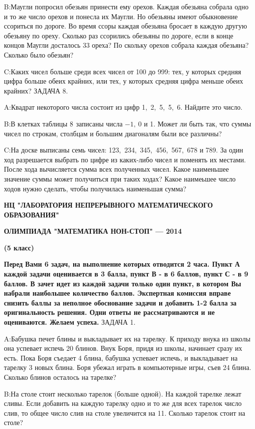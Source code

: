 \documentclass[10pt]{scrbook} \usepackage{modules/nonstahp_book}
\begin{document}
B:\qquad Маугли попросил обезьян принести ему орехов. Каждая обезьяна собрала одно и то же число орехов и понесла их Маугли.
Но обезьяны имеют обыкновение ссориться по дороге. Во время ссоры
каждая обезьяна бросает в каждую другую обезьяну по ореху. Сколько раз ссорились обезьяны по дороге, если в конце концов Маугли досталось 33 ореха? По скольку орехов собрала каждая обезьяна? Сколько было обезьян?

C:\qquad Каких чисел больше среди всех чисел от 100 до 999: тех, у которых средняя цифра больше обеих крайних, или тех, у которых средняя цифра меньше обеих крайних?
\medbreak
\noindent
ЗАДАЧА 8.

A:\qquad Квадрат некоторого числа состоит из цифр 1,\ 2,\ 5,\ 5,\ 6. Найдите это число.

B:\qquad В клетках таблицы $8\time8$ записаны числа $-1,\ 0$ и 1. Может ли быть так, что суммы чисел по строкам, столбцам и большим диагоналям были все различны?

C:\qquad На доске выписаны семь чисел: 123,\ 234,\ 345,\ 456,\ 567,\ 678 и 789. За один ход разрешается выбрать по цифре из каких-либо чисел и поменять их местами. После хода вычисляется сумма всех полученных чисел. Какое наименьшее значение суммы может получиться при таких ходах? Какое наимеьшее число ходов нужно сделать, чтобы получилась наименьшая сумма?
\vfill\eject
\centerline{\bf НЦ "ЛАБОРАТОРИЯ НЕПРЕРЫВНОГО МАТЕМАТИЧЕСКОГО ОБРАЗОВАНИЯ"}
\centerline{\bf ОЛИМПИАДА "МАТЕМАТИКА НОН-СТОП" — 2014}
\bigbreak
\centerline{\bf  (5 класс)}
\medbreak
\noindent
{\bf Перед Вами  6  задач, на выполнение которых отводится  2 часа. Пункт А каждой задачи оценивается в 3 балла, пункт В - в 6 баллов, пункт С - в  9 баллов. В зачет идет из каждой задачи только один пункт, в котором Вы набрали наибольшее количество баллов. Экспертная комиссия вправе снизить баллы за неполное обоснование задачи и добавить 1-2 балла за оригинальность решения. Одни ответы не рассматриваются и не оцениваются. Желаем успеха.}
\medbreak
\noindent
ЗАДАЧА 1.

A:\qquad Бабушка печет блины и выкладывает их на тарелку. К приходу внука из школы она успевает испечь 20 блинов. Внук Боря, придя из школы, начинает сразу их есть. Пока Боря съедает 4 блина, бабушка успевает испечь, и выкладывает на тарелку  3 новых блина. Боря убежал играть в компьютерные игры, съев 24 блина. Сколько блинов осталось на тарелке?

B:\qquad На столе стоит несколько тарелок (больше одной). На каждой тарелке лежат сливы. Если добавить на каждую тарелку одно и то же для всех тарелок число слив, то общее число слив на столе увеличится на 11. Сколько тарелок стоит на столе?
\end{document}
